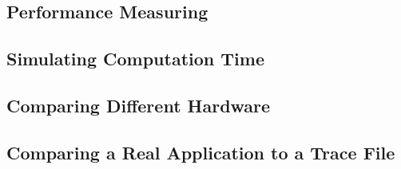 \subsection{Performance Measuring}


\subsection{Simulating Computation Time} 


\subsection{Comparing Different Hardware}


\subsection{Comparing a Real Application to a Trace File}





